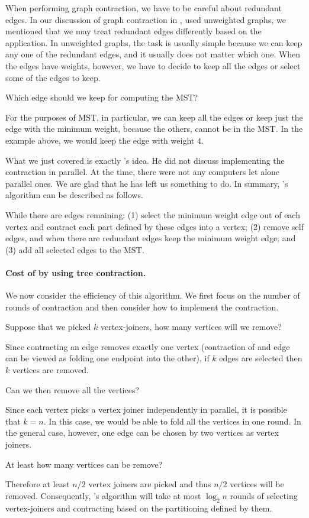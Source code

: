 When performing graph contraction, we have to be careful about
redundant edges. In our discussion of graph contraction in ,
used unweighted graphs, we mentioned that we may treat redundant edges
differently based on the application.  
%
In unweighted graphs, the task is usually simple because we can keep
any one of the redundant edges, and it usually does not matter which
one.  
%
When the edges have weights, however, we have to decide to keep
all the edges or select some of the edges to keep.
\begin{question}
Which edge should we keep for computing the MST?  
\end{question}
%
For the purposes of MST, in particular, we can keep all the edges or
keep just the edge with the minimum weight, because the others, cannot
be in the MST.  In the example above, we would keep the edge with
weight $4$.

What we just covered is exactly \boruvka's idea.  He did not discuss
implementing the contraction in parallel.  At the time, there were not
any computers let alone parallel ones.  We are glad that he has left
us something to do.  In summary, \boruvka's algorithm can be described
as follows.

\begin{algorithm}[\boruvka]
While there are edges remaining: (1) select the minimum weight edge
out of each vertex and contract each part defined by these edges into
a vertex; (2) remove self edges, and when there are redundant edges
keep the minimum weight edge; and (3) add all selected edges to the
MST.
\end{algorithm}

\paragraph{Cost of \boruvka by using tree contraction.}
We now consider the efficiency of this algorithm.  We first focus
on the number of rounds of contraction and
then consider how to implement the contraction.
%
\begin{question}
Suppose that we picked $k$ vertex-joiners, how many vertices
will we remove?
\end{question}
%
Since contracting an edge removes exactly one vertex (contraction of
and edge can be viewed as folding one endpoint into the other), if $k$
edges are selected then $k$ vertices are removed. 
%
\begin{question}
Can we then remove all the vertices? 
\end{question}
%
Since each vertex picks a vertex joiner independently in parallel, it
is possible that $k=n$.
%
In this case, we would be able to fold all the vertices in one round.
%
In the general case, however, one edge can be chosen by two vertices
as vertex joiners.
%
\begin{question}
At least how many vertices can be remove?  
\end{question}
%
Therefore at least $n/2$ vertex joiners are picked and thus $n/2$
vertices will be removed.
%
Consequently, \boruvka's algorithm will take at most $\log_2 n$ rounds
of selecting vertex-joiners and contracting based on the partitioning
defined by them.

